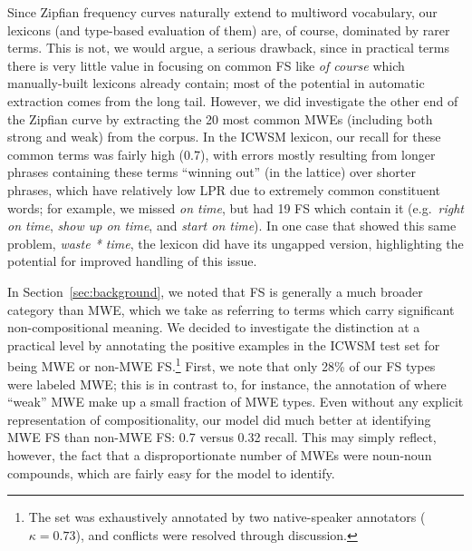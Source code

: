 \documentclass[11pt,letterpaper]{article}
\newcommand{\ex}[1]{\textit{#1}\xspace}
\newcommand{\secref}[2][]{Section#1~\ref{#2}\xspace}
\begin{document}
Since Zipfian frequency curves naturally extend to multiword vocabulary, our lexicons (and type-based evaluation of them) are, of course, dominated by rarer terms. This is not, we would argue, a serious drawback, since in practical terms there is very little value in focusing on common FS like \ex{of course} which manually-built lexicons already contain; most of the potential in automatic extraction comes from the long tail. However, we did investigate the other end of the Zipfian curve by extracting the 20 most common MWEs (including both strong and weak) from the  corpus. In the ICWSM lexicon, our recall for these common terms was fairly high (0.7), with errors mostly resulting from longer phrases containing these terms ``winning out'' (in the lattice) over shorter phrases, which have relatively low LPR due to extremely common constituent words; for example, we missed \ex{on time}, but had 19 FS which contain it (e.g.\ \ex{right on time}, \ex{show up on time}, and \ex{start on time}). In one case that showed this same problem, \ex{waste * time}, the lexicon did have its ungapped version, highlighting the potential for improved handling of this issue. 



In \secref{sec:background}, we noted that FS is generally a much broader category than MWE, which we take as referring to terms which carry significant non-compositional meaning. We decided to investigate the distinction at a practical level by annotating the positive examples in the ICWSM test set for being MWE or non-MWE FS.\footnote{The set was exhaustively annotated by two native-speaker annotators ($\kappa = 0.73$), and conflicts were resolved through discussion.} First, we note that only 28\% of our FS types were labeled MWE; this is in contrast to, for instance, the annotation of  where ``weak'' MWE make up a small fraction of MWE types. Even without any explicit representation of compositionality, our model did much better at identifying MWE FS than non-MWE FS:  0.7 versus 0.32 recall. This may simply reflect, however, the fact that a disproportionate number of MWEs were noun-noun compounds, which are fairly easy for the model to identify.
\end{document}
